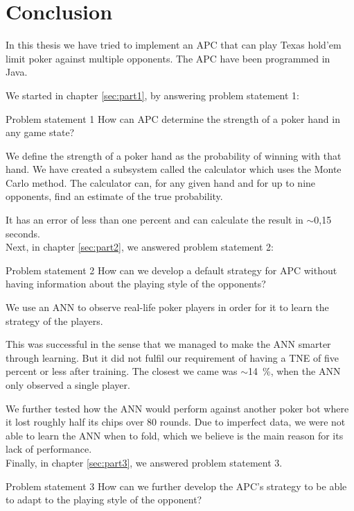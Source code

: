 \section{Conclusion}
In this thesis we have tried to implement an APC that can play Texas hold'em limit poker against multiple opponents. The APC have been programmed in Java.

We started in chapter \ref{sec:part1}, by answering problem statement 1:
\vspace{4mm}
\begin{statementBox2}{Problem statement 1}
How can APC determine the strength of a poker hand in any game state?
\end{statementBox2}
\vspace{4mm}

We define the strength of a poker hand as the probability of winning with that hand.
We have created a subsystem called the calculator which uses the Monte Carlo method. The calculator can, for any given hand and for up to nine opponents, find an estimate of the true probability. 

It has an error of less than one percent and can calculate the result in $\sim$0,15 seconds.\\

Next, in chapter \ref{sec:part2}, we answered problem statement 2:
\vspace{4mm}
\begin{statementBox2}{Problem statement 2}
How can we develop a default strategy for APC without having information about the playing style of the opponents?
\end{statementBox2}
\vspace{4mm}

We use an ANN to observe real-life poker players in order for it to learn the strategy of the players. 

This was successful in the sense that we managed to make the ANN smarter through learning. But it did not fulfil our requirement of having a TNE of five percent or less after training. The closest we came was $\sim$14~\%, when the ANN only observed a single player. 

We further tested how the ANN would perform against another poker bot where it lost roughly half its chips over 80 rounds. Due to imperfect data, we were not able to learn the ANN when to fold, which we believe is the main reason for its lack of performance.\\

Finally, in chapter \ref{sec:part3}, we answered problem statement 3.
\vspace{4mm}
\begin{statementBox2}{Problem statement 3}
How can we further develop the APC's strategy to be able to adapt to the playing style of the opponent?
\end{statementBox2}
\vspace{4mm}

